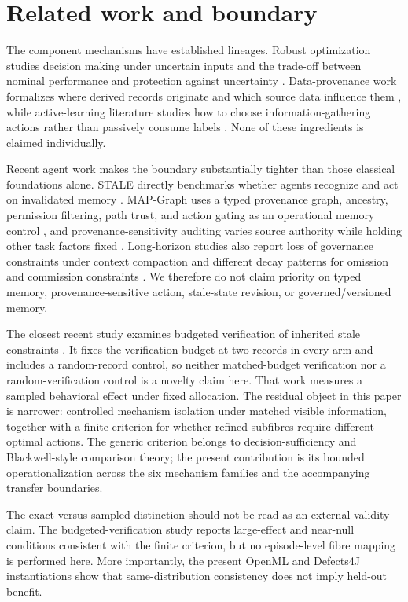 \section{Related work and boundary}

The component mechanisms have established lineages. Robust optimization studies decision making under uncertain inputs and the trade-off between nominal performance and protection against uncertainty \cite{bertsimas2004robustness}. Data-provenance work formalizes where derived records originate and which source data influence them \cite{buneman2001provenance}, while active-learning literature studies how to choose information-gathering actions rather than passively consume labels \cite{settles2009active}. None of these ingredients is claimed individually.

Recent agent work makes the boundary substantially tighter than those classical foundations alone. STALE directly benchmarks whether agents recognize and act on invalidated memory \cite{chao2026stale}. MAP-Graph uses a typed provenance graph, ancestry, permission filtering, path trust, and action gating as an operational memory control \cite{wang2026mapgraph}, and provenance-sensitivity auditing varies source authority while holding other task factors fixed \cite{liao2026provenance}. Long-horizon studies also report loss of governance constraints under context compaction \cite{chen2026governancedecay} and different decay patterns for omission and commission constraints \cite{gamage2026omission}. We therefore do not claim priority on typed memory, provenance-sensitive action, stale-state revision, or governed/versioned memory.

The closest recent study examines budgeted verification of inherited stale constraints \cite{nakayashiki2026staleconstraints}. It fixes the verification budget at two records in every arm and includes a random-record control, so neither matched-budget verification nor a random-verification control is a novelty claim here. That work measures a sampled behavioral effect under fixed allocation. The residual object in this paper is narrower: controlled mechanism isolation under matched visible information, together with a finite criterion for whether refined subfibres require different optimal actions. The generic criterion belongs to decision-sufficiency and Blackwell-style comparison theory; the present contribution is its bounded operationalization across the six mechanism families and the accompanying transfer boundaries.

The exact-versus-sampled distinction should not be read as an external-validity claim. The budgeted-verification study reports large-effect and near-null conditions consistent with the finite criterion, but no episode-level fibre mapping is performed here. More importantly, the present OpenML and Defects4J instantiations show that same-distribution consistency does not imply held-out benefit.

